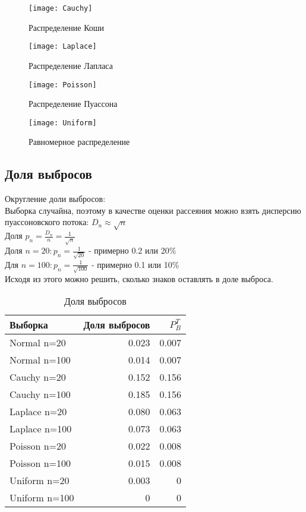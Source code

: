 \documentclass[a4paper]{article}
\begin{document}
\begin{figure}[H]
	\centering
	\texttt{[image: Cauchy]}
	\label{fig:cauchyBox}
	\caption{Распределение Коши} 
\end{figure}

\begin{figure}[H]
    \centering 
	\texttt{[image: Laplace]}
	\label{fig:laplaceBox}
	\caption{Распределение Лапласа} 
\end{figure}

\begin{figure}[H]
	\centering
	\texttt{[image: Poisson]}
	\label{fig:poissonBox}
	\caption{Распределение Пуассона} 
\end{figure}

\begin{figure}[H]
	\centering
	\texttt{[image: Uniform]}
	\label{fig:uniBox}
	\caption{Равномерное распределение} 
\end{figure}

\subsection{Доля выбросов}

\noindent Округление доли выбросов:\\
Выборка случайна, поэтому в качестве оценки рассеяния можно взять дисперсию пуассоновского потока:  $D_n \approx \sqrt{n}$\\
Доля $p_n = \frac{D_n}{n}=\frac{1}{\sqrt{n}}$\\
Доля $n=20: p_n=\frac{1}{\sqrt{20}}$ - примерно 0.2 или 20\% \\
Для $n=100: p_n=\frac{1}{\sqrt{100}}$ - примерно 0.1 или 10\% \\
Исходя из этого можно решить, сколько знаков оставлять в доле выброса.
\begin{table}[H]
	\centering
	\begin{tabular}[t]{lrr}
		\hline
		Выборка   &      Доля выбросов	& $P_B^T$		\\
		\hline
		Normal n=20   	&	0.023 		& 0.007		\\
		Normal n=100   	&  	0.014		& 0.007\\
		Cauchy n=20 	& 	0.152  		& 0.156		\\
		Cauchy n=100	&  	0.185 		& 0.156\\
		Laplace n=20	& 	0.080  		& 0.063	\\
		Laplace n=100	&   0.073 		& 0.063\\
		Poisson n=20	&	0.022 		& 0.008		\\
		Poisson n=100	&	0.015		& 0.008	\\
		Uniform n=20	&	0.003 		& 0		\\
		Uniform n=100	&	0 			& 0	\\
		\hline
	\end{tabular}
	\caption{Доля выбросов}
	\label{tab:eject}
\end{table}
\end{document}

